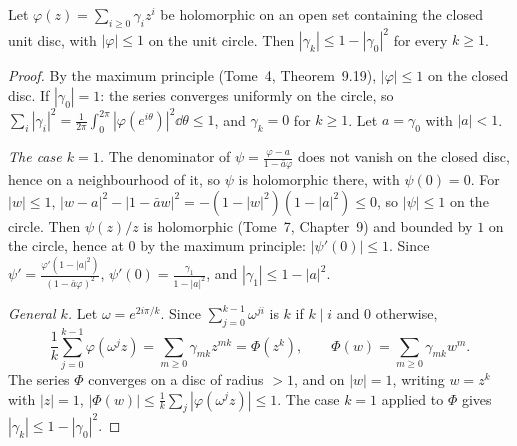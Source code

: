 \begin{lemma}\label{lem:coef}
Let $\varphi(z)=\sum_{i\ge0}\gamma_iz^i$ be holomorphic on an open set containing the closed unit disc, with $|\varphi|\le1$ on the unit circle. Then
$|\gamma_k|\le1-|\gamma_0|^2$ for every $k\ge1$.
\end{lemma}
\begin{proof}
By the maximum principle (Tome~4, Theorem~9.19), $|\varphi|\le1$ on the closed disc. If $|\gamma_0|=1$: the series converges uniformly on the circle, so
$\sum_i|\gamma_i|^2=\frac1{2\pi}\int_0^{2\pi}|\varphi(e^{i\theta})|^2\dd\theta\le1$, and $\gamma_k=0$ for $k\ge1$. Let $a=\gamma_0$ with $|a|<1$.

\emph{The case $k=1$.} The denominator of $\psi=\frac{\varphi-a}{1-\bar a\varphi}$ does not vanish on the closed disc, hence on a neighbourhood of it, so
$\psi$ is holomorphic there, with $\psi(0)=0$. For $|w|\le1$, $|w-a|^2-|1-\bar aw|^2=-(1-|w|^2)(1-|a|^2)\le0$, so $|\psi|\le1$ on the circle. Then
$\psi(z)/z$ is holomorphic (Tome~7, Chapter~9) and bounded by $1$ on the circle, hence at $0$ by the maximum principle: $|\psi'(0)|\le1$. Since
$\psi'=\frac{\varphi'(1-|a|^2)}{(1-\bar a\varphi)^2}$, $\psi'(0)=\frac{\gamma_1}{1-|a|^2}$, and $|\gamma_1|\le1-|a|^2$.

\emph{General $k$.} Let $\omega=e^{2i\pi/k}$. Since $\sum_{j=0}^{k-1}\omega^{ji}$ is $k$ if $k\mid i$ and $0$ otherwise,
\[
\frac1k\sum_{j=0}^{k-1}\varphi(\omega^jz)=\sum_{m\ge0}\gamma_{mk}z^{mk}=\Phi(z^k),\qquad\Phi(w)=\sum_{m\ge0}\gamma_{mk}w^m.
\]
The series $\Phi$ converges on a disc of radius $>1$, and on $|w|=1$, writing $w=z^k$ with $|z|=1$, $|\Phi(w)|\le\frac1k\sum_j|\varphi(\omega^jz)|\le1$.
The case $k=1$ applied to $\Phi$ gives $|\gamma_k|\le1-|\gamma_0|^2$.
\end{proof}

